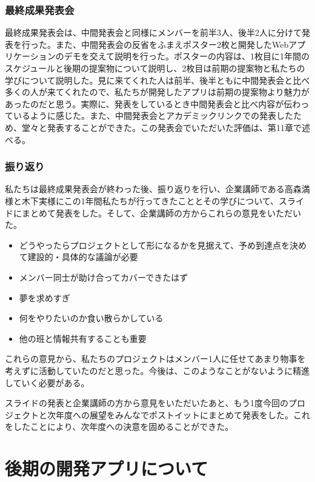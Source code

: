 \documentclass[openany,11pt,papersize]{jsbook}
\begin{document}
\subsection{最終成果発表会}
最終成果発表会は、中間発表会と同様にメンバーを前半3人、後半2人に分けて発表を行った。また、中間発表会の反省をふまえポスター2枚と開発したWebアプリケーションのデモを交えて説明を行った。ポスターの内容は、1枚目に1年間のスケジュールと後期の提案物について説明し、2枚目は前期の提案物と私たちの学びについて説明した。見に来てくれた人は前半、後半ともに中間発表会と比べ多くの人が来てくれたので、私たちが開発したアプリは前期の提案物より魅力があったのだと思う。実際に、発表をしているとき中間発表会と比べ内容が伝わっているように感じた。また、中間発表会とアカデミックリンクでの発表したため、堂々と発表することができた。この発表会でいただいた評価は、第11章で述べる。
\subsection{振り返り}
私たちは最終成果発表会が終わった後、振り返りを行い、企業講師である高森満様と木下実様にこの1年間私たちが行ってきたこととその学びについて、スライドにまとめて発表をした。そして、企業講師の方からこれらの意見をいただいた。
\begin{itemize}
\item 
どうやったらプロジェクトとして形になるかを見据えて、予め到達点を決めて建設的・具体的な議論が必要
\item 
メンバー同士が助け合ってカバーできたはず
\item
夢を求めすぎ
\item
何をやりたいのか食い散らかしている
\item
他の班と情報共有することも重要
\end{itemize}
これらの意見から、私たちのプロジェクトはメンバー1人に任せてあまり物事を考えずに活動していたのだと思った。今後は、このようなことがないように精進していく必要がある。

スライドの発表と企業講師の方から意見をいただいたあと、もう1度今回のプロジェクトと次年度への展望をみんなでポストイットにまとめて発表をした。これをしたことにより、次年度への決意を固めることができた。





\chapter{後期の開発アプリについて}
\end{document}
